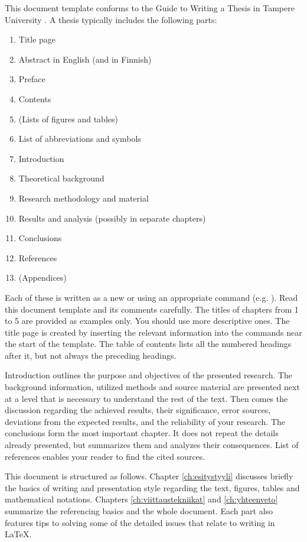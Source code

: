 This document template conforms to the Guide to Writing a Thesis in Tampere University . A thesis typically includes the following parts:

\begin{enumerate}
    \item[] Title page
    \item[] Abstract in English (and in Finnish)
    \item[] Preface
    \item[] Contents
    \item[] (Lists of figures and tables)
    \item[] List of abbreviations and symbols
    \item Introduction
    \item Theoretical background
    \item Research methodology and material
    \item Results and analysis (possibly in separate chapters)
    \item Conclusions
    \item[] References
    \item[] (Appendices)
\end{enumerate}

Each of these is written as a new  or using an appropriate command (e.g. ). Read this document template and its comments carefully. The titles of chapters from 1 to 5 are provided as examples only. You should use more descriptive ones. The title page is created by inserting the relevant information into the commands near the start of the template. The table of contents lists all the numbered headings after it, but not always the preceding headings.

Introduction outlines the purpose and objectives of the presented research. The background information, utilized methods and source material are presented next at a level that is necessary to understand the rest of the text. Then comes the discussion regarding the achieved results, their significance, error sources, deviations from the expected results, and the reliability of your research. The conclusions form the most important chapter. It does not repeat the details already presented, but summarizes them and analyzes their consequences. List of references enables your reader to find the cited sources.

This document is structured as follows. Chapter \ref{ch:esitystyyli} discusses briefly the basics of writing and presentation style regarding the text, figures, tables and mathematical notations. Chapters \ref{ch:viittaustekniikat} and \ref{ch:yhteenveto} summarize the referencing basics and the whole document. Each part also features tips to solving some of the detailed issues that relate to writing in \LaTeX.
